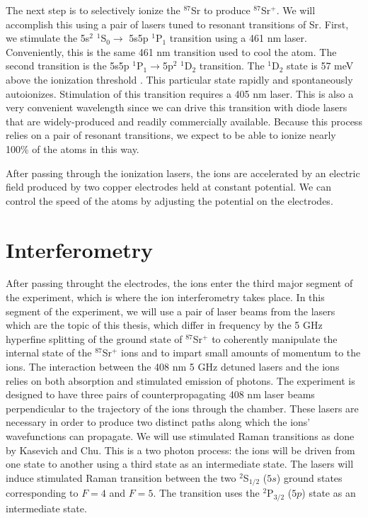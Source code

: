 The next step is to selectively ionize the $^{87}$Sr to produce $^{87}$Sr$^+$. We will accomplish this using a pair of lasers tuned to resonant transitions of Sr. First, we stimulate the 5s$^2$ $^1$S$_0 \rightarrow$ 5s5p $^1$P$_1$ transition using a 461 nm laser. Conveniently, this is the same 461 nm transition used to cool the atom. The second transition is the 5s5p $^1$P$_1\rightarrow$5p$^2$ $^1$D$_2$ transition. The $^1$D$_2$ state is 57 meV above the ionization threshold \cite{NSFprop}. This particular state rapidly and spontaneously autoionizes. Stimulation of this transition requires a 405 nm laser. This is also a very convenient wavelength since we can drive this transition with diode lasers that are widely-produced and readily commercially available. Because this process relies on a pair of resonant transitions, we expect to be able to ionize nearly 100\% of the atoms in this way. 

After passing through the ionization lasers, the ions are accelerated by an electric field produced by two copper electrodes held at constant potential. We can control the speed of the atoms by adjusting the potential on the electrodes.%

\section{Interferometry}

After passing throught the electrodes, the ions enter the third major segment of the experiment, which is where the ion interferometry takes place. In this segment of the experiment, we will use a pair of laser beams from the lasers which are the topic of this thesis, which differ in frequency by the 5 GHz hyperfine splitting of the ground state of $^{87}$Sr$^+$
to coherently manipulate the internal state of the $^{87}$Sr$^+$ ions and to impart small amounts of momentum to the ions. 
The interaction between the 408 nm 5 GHz detuned lasers and the ions relies on both absorption and stimulated emission of photons. The experiment is designed to have three pairs of counterpropagating 408 nm laser beams perpendicular to the trajectory of the ions through the chamber. 
These lasers are necessary in order to produce two distinct paths along which the ions' wavefunctions can propagate. We will use stimulated Raman transitions as done by Kasevich and Chu\cite{kasevichChu1991}. This is a two photon process: %
the ions will be driven from one state to another using a third state as an intermediate state.
The lasers will induce stimulated Raman transition between the two $^2$S$_{1/2}$ ($5s$) ground states corresponding to $F=4$ and $F=5$. The transition uses the $^2$P$_{3/2}$ ($5p$) state as an intermediate state.

